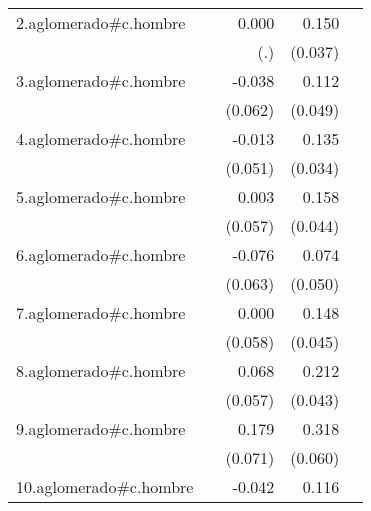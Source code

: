 {\begin{longtable}{l*{4}{D{.}{.}{-1}}}
\addlinespace
2.aglomerado#c.hombre&                     &       0.000         &       0.150\sym{***}&                     \\
            &                     &         (.)         &     (0.037)         &                     \\
\addlinespace
3.aglomerado#c.hombre&                     &      -0.038         &       0.112\sym{*}  &                     \\
            &                     &     (0.062)         &     (0.049)         &                     \\
\addlinespace
4.aglomerado#c.hombre&                     &      -0.013         &       0.135\sym{***}&                     \\
            &                     &     (0.051)         &     (0.034)         &                     \\
\addlinespace
5.aglomerado#c.hombre&                     &       0.003         &       0.158\sym{***}&                     \\
            &                     &     (0.057)         &     (0.044)         &                     \\
\addlinespace
6.aglomerado#c.hombre&                     &      -0.076         &       0.074         &                     \\
            &                     &     (0.063)         &     (0.050)         &                     \\
\addlinespace
7.aglomerado#c.hombre&                     &       0.000         &       0.148\sym{***}&                     \\
            &                     &     (0.058)         &     (0.045)         &                     \\
\addlinespace
8.aglomerado#c.hombre&                     &       0.068         &       0.212\sym{***}&                     \\
            &                     &     (0.057)         &     (0.043)         &                     \\
\addlinespace
9.aglomerado#c.hombre&                     &       0.179\sym{*}  &       0.318\sym{***}&                     \\
            &                     &     (0.071)         &     (0.060)         &                     \\
\addlinespace
10.aglomerado#c.hombre&                     &      -0.042         &       0.116\sym{**} &                     \\

\end{longtable}}
